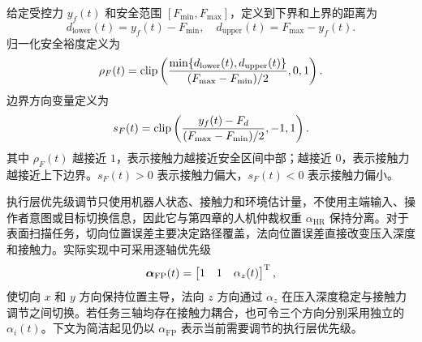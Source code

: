 \begin{definition}[接触力安全裕度]
\label{def:ch3_force_margin}
给定受控力 $y_f(t)$ 和安全范围 $[F_{\min},F_{\max}]$，定义到下界和上界的距离为
\begin{equation}
  d_{\mathrm{lower}}(t)=y_f(t)-F_{\min},
  \quad d_{\mathrm{upper}}(t)=F_{\max}-y_f(t) .
  \label{eq:ch3_force_distances}
\end{equation}
归一化安全裕度定义为
\begin{equation}
  \rho_F(t)=\operatorname{clip}\left(\frac{\min\{d_{\mathrm{lower}}(t),d_{\mathrm{upper}}(t)\}}{(F_{\max}-F_{\min})/2},0,1\right) .
  \label{eq:ch3_rhoF}
\end{equation}
边界方向变量定义为
\begin{equation}
  s_F(t)=\operatorname{clip}\left(\frac{y_f(t)-F_d}{(F_{\max}-F_{\min})/2},-1,1\right) .
  \label{eq:ch3_sF}
\end{equation}
其中 $\rho_F(t)$ 越接近 $1$，表示接触力越接近安全区间中部；越接近 $0$，表示接触力越接近上下边界。$s_F(t)>0$ 表示接触力偏大，$s_F(t)<0$ 表示接触力偏小。
\end{definition}

执行层优先级调节只使用机器人状态、接触力和环境估计量，不使用主端输入、操作者意图或目标切换信息，因此它与第四章的人机仲裁权重 $\alpha_{\mathrm{HR}}$ 保持分离。对于表面扫描任务，切向位置误差主要决定路径覆盖，法向位置误差直接改变压入深度和接触力。实际实现中可采用逐轴优先级
\begin{equation}
  \boldsymbol{\alpha}_{\mathrm{FP}}(t)
  =
  \begin{bmatrix}
  1 & 1 & \alpha_z(t)
  \end{bmatrix}^{\mathrm{T}},
  \label{eq:ch3_axis_alpha}
\end{equation}
使切向 $x$ 和 $y$ 方向保持位置主导，法向 $z$ 方向通过 $\alpha_z$ 在压入深度稳定与接触力调节之间切换。若任务三轴均存在接触力耦合，也可令三个方向分别采用独立的 $\alpha_i(t)$。下文为简洁起见仍以 $\alpha_{\mathrm{FP}}$ 表示当前需要调节的执行层优先级。

